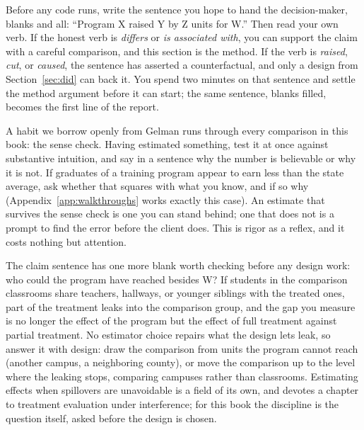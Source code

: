 Before any code runs, write the sentence you hope to hand the decision-maker, blanks and all: \enquote{Program X raised Y by Z units for W.} Then read your own verb. If the honest verb is \emph{differs} or \emph{is associated with}, you can support the claim with a careful comparison, and this section is the method. If the verb is \emph{raised}, \emph{cut}, or \emph{caused}, the sentence has asserted a counterfactual, and only a design from Section~\ref{sec:did} can back it. You spend two minutes on that sentence and settle the method argument before it can start; the same sentence, blanks filled, becomes the first line of the report.

A habit we borrow openly from Gelman runs through every comparison in this book: the sense check. Having estimated something, test it at once against substantive intuition, and say in a sentence why the number is believable or why it is not. If graduates of a training program appear to earn less than the state average, ask whether that squares with what you know, and if so why (Appendix~\ref{app:walkthroughs} works exactly this case). An estimate that survives the sense check is one you can stand behind; one that does not is a prompt to find the error before the client does. This is rigor as a reflex, and it costs nothing but attention.

The claim sentence has one more blank worth checking before any design work: who could the program have reached besides W? If students in the comparison classrooms share teachers, hallways, or younger siblings with the treated ones, part of the treatment leaks into the comparison group, and the gap you measure is no longer the effect of the program but the effect of full treatment against partial treatment. No estimator choice repairs what the design lets leak, so answer it with design: draw the comparison from units the program cannot reach (another campus, a neighboring county), or move the comparison up to the level where the leaking stops, comparing campuses rather than classrooms. Estimating effects when spillovers are unavoidable is a field of its own, and \textcite{huber2023causal} devotes a chapter to treatment evaluation under interference; for this book the discipline is the question itself, asked before the design is chosen.

